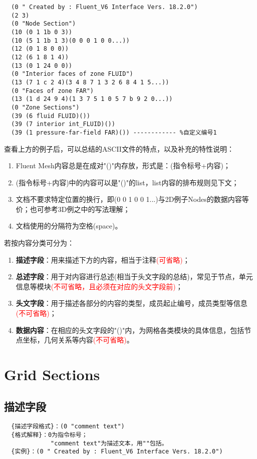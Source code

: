 \documentclass[lang=cn,11pt,a4paper]{elegantpaper} %
\begin{document}
\begin{lstlisting}
  (0 " Created by : Fluent_V6 Interface Vers. 18.2.0")
  (2 3)
  (0 "Node Section")
  (10 (0 1 1b 0 3))
  (10 (5 1 1b 1 3)(0 0 0 1 0 0...))
  (12 (0 1 8 0 0))
  (12 (6 1 8 1 4))
  (13 (0 1 24 0 0))
  (0 "Interior faces of zone FLUID")
  (13 (7 1 c 2 4)(3 4 8 7 1 3 2 6 8 4 1 5...))
  (0 "Faces of zone FAR")
  (13 (1 d 24 9 4)(1 3 7 5 1 0 5 7 b 9 2 0...))
  (0 "Zone Sections")
  (39 (6 fluid FLUID)())
  (39 (7 interior int_FLUID)())
  (39 (1 pressure-far-field FAR)()) ------------ %自定义编号1
\end{lstlisting}

查看上方的例子后，可以总结的ASCII文件的特点，以及补充的特性说明：
\begin{enumerate}
  \item Fluent Mesh内容总是在成对"()"内存放，形式是：(指令标号+内容)；
  \item (指令标号+内容)中的内容可以是"()"的list，list内容的排布规则见下文；
  \item 文档不要求特定位置的换行，即(0 0 1 0 0 1...)与2D例子Nodes的数据内容等价；也可参考3D例之中的写法理解；
  \item 文档使用的分隔符为空格(space)。
\end{enumerate}

若按内容分类可分为：
\begin{enumerate}
  \item \textbf{描述字段}：用来描述下方的内容，相当于注释\textcolor{red}{(可省略)}；
  \item \textbf{总述字段}：用于对内容进行总述(相当于头文字段的总结)，常见于节点，单元信息等模块\textcolor{red}{(不可省略，且必须在对应的头文字段前)}；
  \item \textbf{头文字段}：用于描述各部分的内容的类型，成员起止编号，成员类型等信息\textcolor{red}{(不可省略)}；
  \item \textbf{数据内容}：在相应的头文字段的"()"内，为网格各类模块的具体信息，包括节点坐标，几何关系等内容\textcolor{red}{(不可省略)}。
\end{enumerate}


\section{Grid Sections}\label{GridSections}

\subsection{描述字段}\label{Comment}
\begin{lstlisting}
  {描述字段格式}：(0 "comment text")
  {格式解释}：0为指令标号；
             "comment text"为描述文本，用""包括。
  {实例}：(0 " Created by : Fluent_V6 Interface Vers. 18.2.0")
\end{lstlisting}
\end{document}
